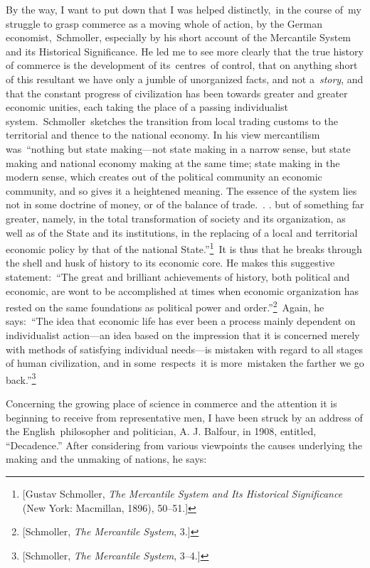 \documentclass[openany,nobib]{tufte-book}
\begin{document}
By the way, I want to put down that I was helped distinctly,~in the
course of~my struggle to grasp commerce as a moving whole of action, by
the German economist,~Schmoller, especially by his short account of the
Mercantile System and its Historical Significance. He led me to see more
clearly that the true history of commerce is the development of
its~centres~of control, that on anything short of this resultant we have
only a jumble of unorganized facts, and not a~\emph{story}, and that the
constant progress of civilization has been towards greater and greater
economic unities, each taking the place of a passing individualist
system.~Schmoller~sketches the transition from local trading customs to
the territorial and thence to the national economy. In his view
mercantilism was~``nothing but state making---not state making in a
narrow sense, but state making and national economy making at the same
time; state making in the modern sense, which creates out of the
political community an economic community, and so gives it a heightened
meaning. The essence of the system lies not in some doctrine of money,
or of the balance of trade.~. . but of something far greater, namely, in
the total transformation of society and its organization, as well as of
the State and its institutions, in the replacing of a local and
territorial economic policy by that of the national
State.''\footnote{{[}Gustav Schmoller, \emph{The Mercantile System and
  Its Historical Significance} (New York: Macmillan, 1896), 50--51.{]}}~It
is thus that he breaks through the shell and husk of history to its
economic core. He makes this suggestive statement:~``The great and
brilliant achievements of history, both political and economic, are wont
to be accomplished at times when economic organization has rested on the
same foundations as political power and order.''\footnote{{[}Schmoller,
  \emph{The Mercantile System}, 3.{]}}~Again, he says:~``The idea that
economic life has ever been a process mainly dependent on individualist
action---an idea based on the impression that it is concerned merely
with methods of satisfying individual needs---is mistaken with regard to
all stages of human civilization, and in some~respects~it is
more~mistaken the farther we go back.''\footnote{{[}Schmoller, \emph{The
  Mercantile System}, 3--4.{]}}

\newpage Concerning the growing place of science in commerce and the attention it
is beginning to receive from representative men, I have been struck by
an address of the English~philosopher and politician, A. J. Balfour, in
1908, entitled, ``Decadence.'' After considering from various viewpoints
the causes underlying the making and the unmaking of nations, he says:~
\end{document}
